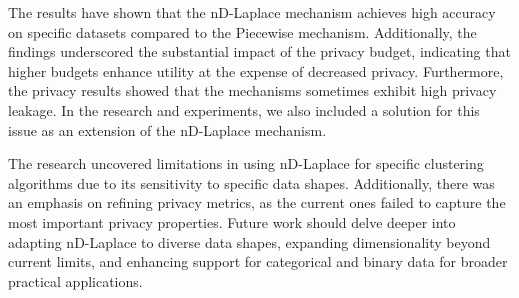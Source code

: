 The results have shown that the nD-Laplace mechanism achieves high accuracy on specific datasets compared to the Piecewise mechanism. 
Additionally, the findings underscored the substantial impact of the privacy budget, indicating that higher budgets enhance utility at the expense of decreased privacy. 
Furthermore, the privacy results showed that the mechanisms sometimes exhibit high privacy leakage. 
In the research and experiments, we also included a solution for this issue as an extension of the nD-Laplace mechanism. \newline

The research uncovered limitations in using nD-Laplace for specific clustering algorithms due to its sensitivity to specific data shapes. Additionally, there was an emphasis on refining privacy metrics, as the current ones failed to capture the most important privacy properties. Future work should delve deeper into adapting nD-Laplace to diverse data shapes, expanding dimensionality beyond current limits, and enhancing support for categorical and binary data for broader practical applications.